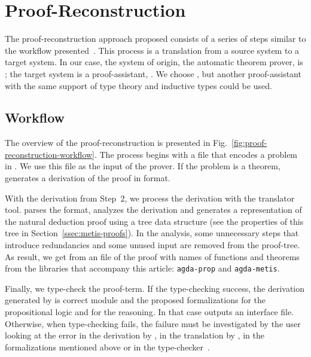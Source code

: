 \documentclass[../main.tex]{subfiles}
\begin{document}

\section{Proof-Reconstruction}
\label{sec:proof-reconstruction}

The proof-reconstruction approach proposed consists of a series of
steps similar to the workflow presented~\cite{sultana2015}. This
process is a translation from a source system to a target system. In
our case, the system of origin, the automatic theorem prover, is
\Metis; the target system is a proof-assistant, \Agda. We choose
\Agda, but another proof-assistant with the same support of type
theory and inductive types could be used.

\subsection{Workflow}
\label{ssec:workflow}


The overview of the proof-reconstruction is presented in
Fig.~\ref{fig:proof-reconstruction-workflow}. The process begins with
a \TPTP file that encodes a problem in \CPL. We use this file as the
input of the \Metis prover. If the problem is a theorem, \Metis
generates a derivation of the proof in \TSTP format.

With the \TSTP derivation from Step~2, we process the derivation with the
\Athena translator tool.
\Athena parses the \TSTP format, analyzes the
derivation and generates a representation of the natural deduction
proof using a tree data structure (see the properties
of this tree in Section~\ref{ssec:metis-proofs}).
In the \Athena analysis, some unnecessary steps that introduce redundancies
and some unused input are removed from the proof-tree.
As result, we get from \Athena an \Agda file of the proof
with names of functions and theorems from
the \Agda libraries that accompany this article:
\texttt{agda-prop} and \texttt{agda-metis}.

Finally, we type-check the \Agda proof-term. If the type-checking
success, the \TSTP derivation generated by \Metis is correct
module \Agda and the proposed formalizations for the
propositional logic and for the \Metis reasoning.
In that case \Agda outputs an interface file.
Otherwise, when type-checking fails, the failure must be
investigated by the user looking at the error in the \TSTP derivation
by \Metis, in the translation by \Athena, in the \Agda formalizations
mentioned above or in the type-checker~\Agda.
\end{document}
